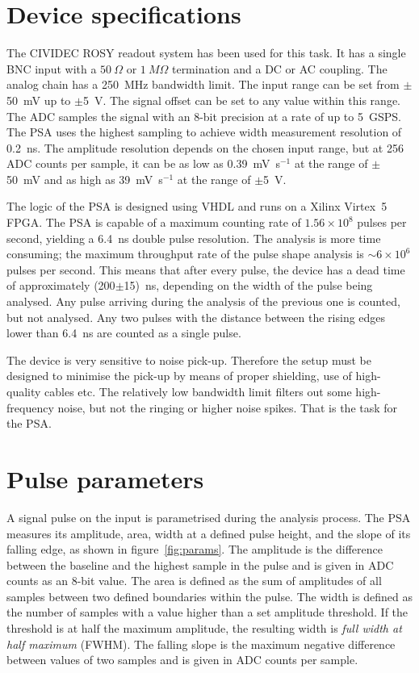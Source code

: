 \section{Device specifications}
The CIVIDEC ROSY readout system has been used for this task. It has a single BNC input with a $50~\Omega$ or $1~M\Omega$ termination and a DC or AC coupling. The analog chain has a 250~MHz bandwidth limit. The input range can be set from $\pm$50~mV up to $\pm$5~V. The signal offset can be set to any value within this range. The ADC samples the signal with an 8-bit precision at a rate of up to 5~GSPS. The PSA uses the highest sampling to achieve width measurement resolution of 0.2~ns. 
The amplitude resolution depends on the chosen input range, but at 256 ADC counts per sample, it can be as low as 0.39~mV~s$^{-1}$ at the range of $\pm$50~mV and as high as 39~mV~s$^{-1}$ at the range of $\pm$5~V.

The logic of the PSA is designed using VHDL and runs on a Xilinx Virtex~5 FPGA. The PSA is capable of a maximum counting rate of $1.56\times10^8$ pulses per second, yielding a 6.4~ns double pulse resolution. The analysis is more time consuming; the maximum throughput rate of the pulse shape analysis is $\sim6\times10^6$ pulses per second. This means that after every pulse, the device has a dead time of approximately (200$\pm$15)~ns, depending on the width of the pulse being analysed. Any pulse arriving during the analysis of the previous one is counted, but not analysed. Any two pulses with the distance between the rising edges lower than 6.4~ns are counted as a single pulse.

The device is very sensitive to noise pick-up. Therefore the setup must be designed to minimise the pick-up by means of proper shielding, use of high-quality cables etc. The relatively low bandwidth limit filters out some high-frequency noise, but not the ringing or higher noise spikes. That is the task for the PSA.


\section{Pulse parameters}
\label{sec:pulsepar}
A signal pulse on the input is parametrised during the analysis process. The PSA measures its amplitude, area, width at a defined pulse height, and the slope of its falling edge, as shown in figure~\ref{fig:params}. The amplitude is the difference between the baseline and the highest sample in the pulse and is given in ADC counts as an 8-bit value. The area is defined as the sum of amplitudes of all samples between two defined boundaries within the pulse. The width is defined as the number of samples with a value higher than a set amplitude threshold. If the threshold is at half the maximum amplitude, the resulting width is \emph{full width at half maximum} (FWHM). The falling slope is the maximum negative difference between values of two samples and is given in ADC counts per sample. 



